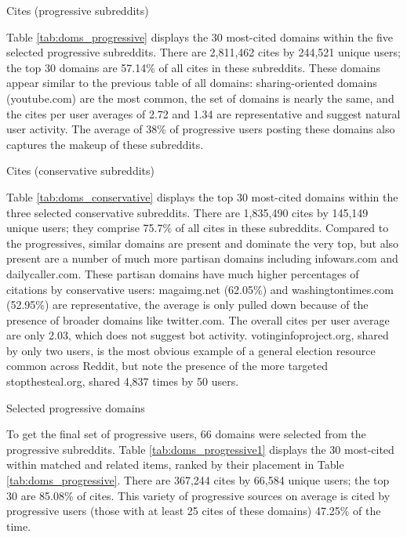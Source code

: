 \documentclass[doublespacing]{utdthesis}
\begin{document}
\begin{table}[!ht]
\centering
\caption{Cites (progressive subreddits)}

\label{tab:doms_progressive}
\end{table}

Table \ref{tab:doms_progressive} displays the 30 most-cited domains within the five selected progressive subreddits.
There are 2,811,462 cites by 244,521 unique users; the top 30 domains are 57.14\% of all cites in these subreddits.
These domains appear similar to the previous table of all domains:
sharing-oriented domains (youtube.com) are the most common, the set of domains  is nearly the same, and the cites per user averages of 2.72 and 1.34 are representative and suggest natural user activity.
The average of 38\% of progressive users posting these domains also captures the makeup of these subreddits. 

\begin{table}[!ht]
\centering
\caption{Cites (conservative subreddits)}

\label{tab:doms_conservative}
\end{table}

Table \ref{tab:doms_conservative} displays the top 30 most-cited domains within the three selected conservative subreddits.
There are 1,835,490 cites by 145,149 unique users; they comprise 75.7\% of all cites in these subreddits.
Compared to the progressives, similar domains are present and dominate the very top, but also present are a number of much more partisan domains including infowars.com and dailycaller.com.
These partisan domains have much higher percentages of citations by conservative users: magaimg.net (62.05\%) and washingtontimes.com (52.95\%) are representative, the average is only pulled down because of the presence of broader domains like twitter.com.
The overall cites per user average are only 2.03, which does not suggest bot activity.
votinginfoproject.org, shared by only two users, is the most obvious example of a general election resource common across Reddit, but note the presence of the more targeted stopthesteal.org, shared 4,837 times by 50 users.

\begin{table}[!ht]
\centering
\caption{Selected progressive domains}

\label{tab:doms_progressive1}
\end{table}

To get the final set of progressive users, 66 domains were selected from the progressive subreddits.
Table \ref{tab:doms_progressive1} displays the 30 most-cited within matched and related items, ranked by their placement in Table \ref{tab:doms_progressive}.
There are 367,244 cites by 66,584 unique users; the top 30 are 85.08\% of cites.
This variety of progressive sources on average is cited by progressive users (those with at least 25 cites of these domains) 47.25\% of the time.
\end{document}
